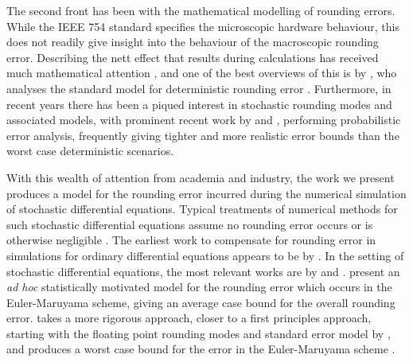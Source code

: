 \documentclass[manuscript,review]{acmart}
\begin{document}
The second front has been with the mathematical modelling of rounding errors. While the IEEE 754 standard specifies the microscopic hardware behaviour, this does not readily give insight into the behaviour of the macroscopic rounding error. Describing the nett effect that results during calculations has received much mathematical attention \citep{higham2002accuracy,wilkinson1961error,wilkinson1974numerical,wilkinson1986error,hull1966tests}, and one of the best overviews of this is by \citet{higham2002accuracy}, who analyses the standard model for deterministic rounding error \citep[2.2, (2.4)]{higham2002accuracy}. Furthermore, in recent years there has been a piqued interest in stochastic rounding modes and associated models, with prominent recent work by \citet{higham2019new} and \citet{ipsen2019probabilistic}, performing probabilistic error analysis, frequently giving tighter and more realistic error bounds than the worst case deterministic scenarios.  

With this wealth of attention from academia and industry, the work we present produces a model for the rounding error incurred during the numerical simulation of stochastic differential equations. Typical treatments of numerical methods for such stochastic differential equations assume no rounding error occurs or is otherwise negligible \citep[9.3, page~316]{kloeden1999numerical} \citep{glasserman2013monte}. The earliest work to compensate for rounding error in simulations for ordinary differential equations appears to be by \citet{vitasek1969numerical}. In the setting of stochastic differential equations, the most relevant works are by \citet{arciniega2003rounding} and \citet{omland2016mixed}. \citet{arciniega2003rounding} present an \textit{ad hoc} statistically motivated model for the rounding error which occurs in the Euler-Maruyama scheme, giving an average case bound for the overall rounding error. \citet{omland2016mixed} takes a more rigorous approach, closer to a first principles approach, starting with the floating point rounding modes and standard error model by \citet{higham2002accuracy}, and produces a worst case bound for the error in the Euler-Maruyama scheme \citep[theorem~4.8]{omland2016mixed}. 
\end{document}
